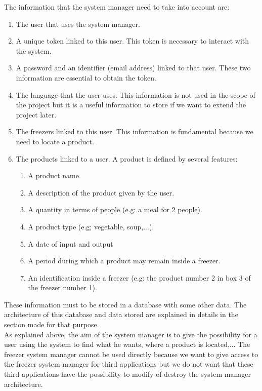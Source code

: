 The information that the system manager need to take into account are:
\begin{enumerate}
\item The user that uses the system manager.
\item A unique token linked to this user. This token is necessary to interact with the system.
\item A password and an identifier (email address) linked to that user. These two information are essential to obtain the token.
\item The language that the user uses. This information is not used in the scope of the project but it is a useful information to store if we want to extend the project later.
\item The freezers linked to this user. This information is fundamental because we need to locate a product.
\item The products linked to a user. A product is defined by several features: 
\begin{enumerate}
\item A product name.
\item A description of the product given by the user.
\item A quantity in terms of people (e.g: a meal for 2 people).
\item A product type (e.g; vegetable, soup,...).
\item A date of input and output
\item A period during which a product may remain inside a freezer.
\item An identification inside a freezer (e.g: the product number 2 in box 3 of the freezer number 1).
\end{enumerate}
\end{enumerate}

These information must to be stored in a database with some other data. The architecture of this database and data stored are explained in details in the section made for that purpose.\\

As explained above, the aim of the system manager is to give the possibility for a user using the system to find what he wants, where a product is located,... The freezer system manager cannot be used directly because we want to give access to the freezer system manager for third applications but we do not want that these third applications have the possibility to modify of destroy the system manager architecture.\\

